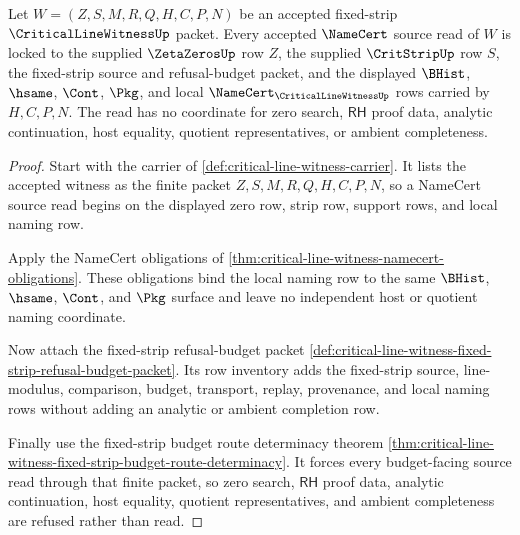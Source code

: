 \begin{theorem}
\label{thm:critical-line-witness-fixed-strip-namecert-source-lock}
Let $W=(Z,S,M,R,Q,H,C,P,N)$ be an accepted fixed-strip
$\CriticalLineWitnessUp$ packet. Every accepted $\NameCert$ source read of
$W$ is locked to the supplied $\ZetaZerosUp$ row $Z$, the supplied
$\CritStripUp$ row $S$, the fixed-strip source and refusal-budget packet,
and the displayed $\BHist$, $\hsame$, $\Cont$, $\Pkg$, and local
$\NameCert_{\CriticalLineWitnessUp}$ rows carried by $H,C,P,N$. The read
has no coordinate for zero search, $\mathsf{RH}$ proof data, analytic
continuation, host equality, quotient representatives, or ambient
completeness.
\end{theorem}
\begin{proof}
Start with the carrier of \autoref{def:critical-line-witness-carrier}. It
lists the accepted witness as the finite packet $Z,S,M,R,Q,H,C,P,N$, so a
NameCert source read begins on the displayed zero row, strip row, support
rows, and local naming row.

Apply the NameCert obligations of
\autoref{thm:critical-line-witness-namecert-obligations}. These obligations
bind the local naming row to the same $\BHist$, $\hsame$, $\Cont$, and
$\Pkg$ surface and leave no independent host or quotient naming coordinate.

Now attach the fixed-strip refusal-budget packet
\autoref{def:critical-line-witness-fixed-strip-refusal-budget-packet}. Its
row inventory adds the fixed-strip source, line-modulus, comparison, budget,
transport, replay, provenance, and local naming rows without adding an
analytic or ambient completion row.

Finally use the fixed-strip budget route determinacy theorem
\autoref{thm:critical-line-witness-fixed-strip-budget-route-determinacy}.
It forces every budget-facing source read through that finite packet, so
zero search, $\mathsf{RH}$ proof data, analytic continuation, host equality,
quotient representatives, and ambient completeness are refused rather than
read.
\end{proof}

